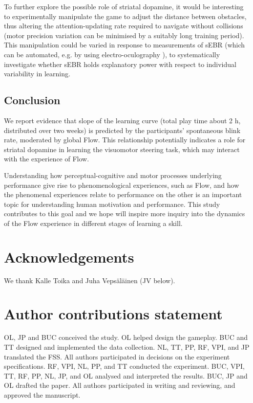 \documentclass[10pt,letterpaper,floatsintext]{article}
\begin{document}
To further explore the possible role of striatal dopamine, it would be interesting to experimentally manipulate the game to adjust the distance between obstacles, thus altering the attention-updating rate required to navigate without collisions (motor precision variation can be minimised by a suitably long training period). This manipulation could be varied in response to measurements of sEBR (which can be automated, e.g. by using electro-oculography \cite{toivanen2014}), to systematically investigate whether sEBR holds explanatory power with respect to individual variability in learning.


\subsection{Conclusion}

We report evidence that slope of the learning curve (total play time about 2 h, distributed over two weeks) is predicted by the participants' spontaneous blink rate, moderated by global Flow. This relationship potentially indicates a role for striatal dopamine in learning the visuomotor steering task, which may interact with the experience of Flow.

Understanding how perceptual-cognitive and motor processes underlying performance give rise to phenomenological experiences, such as Flow, and how the phenomenal experiences relate to performance on the other is an important topic for understanding human motivation and performance. This study contributes to this goal and we hope will inspire more inquiry into the dynamics of the Flow experience in different stages of learning a skill.




\section{Acknowledgements}
We thank Kalle Toika and Juha Veps\"{a}l\"{a}inen (JV below).

\section*{Author contributions statement}
OL, JP and BUC conceived the study.
OL helped design the gameplay.
BUC and TT designed and implemented the data collection.
NL, TT, PP, RF, VPI, and JP translated the FSS.
All authors participated in decisions on the experiment specifications.
RF, VPI, NL, PP, and TT conducted the experiment.
BUC, VPI, TT, RF, PP, NL, JP, and OL analysed and interpreted the results.
BUC, JP and OL drafted the paper.
All authors participated in writing and reviewing, and approved the manuscript.




\setlength{\bibleftmargin}{.125in}
\setlength{\bibindent}{-\bibleftmargin}


\end{document}
